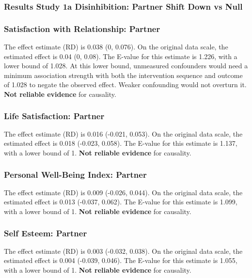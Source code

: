 \documentclass[
  singlecolumn]{article}
\begin{document}
\subsubsection{Results Study 1a Disinhibition: Partner Shift Down vs
Null}\label{results-study-1a-disinhibition-partner-shift-down-vs-null}

\subsubsection{Satisfaction with Relationship:
Partner}\label{satisfaction-with-relationship-partner-2}

The effect estimate (RD) is 0.038 (0, 0.076). On the original data
scale, the estimated effect is 0.04 (0, 0.08). The E-value for this
estimate is 1.226, with a lower bound of 1.028. At this lower bound,
unmeasured confounders would need a minimum association strength with
both the intervention sequence and outcome of 1.028 to negate the
observed effect. Weaker confounding would not overturn it. \textbf{Not
reliable evidence} for causality.

\subsubsection{Life Satisfaction:
Partner}\label{life-satisfaction-partner-2}

The effect estimate (RD) is 0.016 (-0.021, 0.053). On the original data
scale, the estimated effect is 0.018 (-0.023, 0.058). The E-value for
this estimate is 1.137, with a lower bound of 1. \textbf{Not reliable
evidence} for causality.

\subsubsection{Personal Well-Being Index:
Partner}\label{personal-well-being-index-partner-2}

The effect estimate (RD) is 0.009 (-0.026, 0.044). On the original data
scale, the estimated effect is 0.013 (-0.037, 0.062). The E-value for
this estimate is 1.099, with a lower bound of 1. \textbf{Not reliable
evidence} for causality.

\subsubsection{Self Esteem: Partner}\label{self-esteem-partner-2}

The effect estimate (RD) is 0.003 (-0.032, 0.038). On the original data
scale, the estimated effect is 0.004 (-0.039, 0.046). The E-value for
this estimate is 1.055, with a lower bound of 1. \textbf{Not reliable
evidence} for causality.
\end{document}
